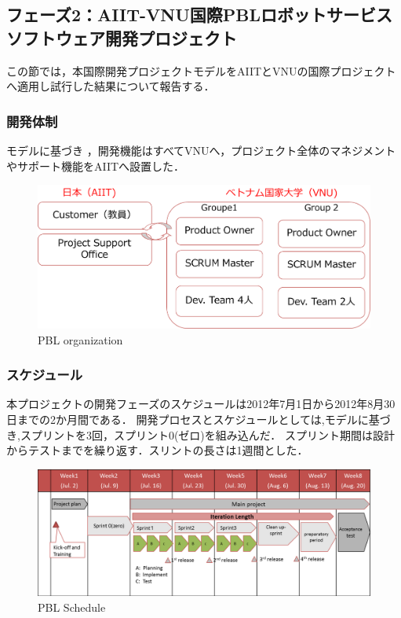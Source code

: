\documentclass[a4j, 12Q, twocolumn, twoside]{jsarticle}
\begin{document}
\subsection{フェーズ2：AIIT-VNU国際PBLロボットサービスソフトウェア開発プロジェクト}

この節では，本国際開発プロジェクトモデルをAIITとVNUの国際プロジェクトへ適用し試行した結果について報告する．

\subsubsection{開発体制}
モデルに基づき ，開発機能はすべてVNUへ，プロジェクト全体のマネジメントやサポート機能をAIITへ設置した．
\begin{figure}[htb]
  \begin{center}
    \includegraphics[width=\columnwidth]{./figures/PBL_organization.png}
    \caption{PBL organization}
    \label{fig:pblorganization}
  \end{center}
\end{figure}



\subsubsection{スケジュール}
本プロジェクトの開発フェーズのスケジュールは2012年7月1日から2012年8月30日までの2か月間である．
開発プロセスとスケジュールとしては,モデルに基づき,スプリントを3回，スプリント0(ゼロ)を組み込んだ．
スプリント期間は設計からテストまでを繰り返す．スリントの長さは1週間とした．
\begin{figure}[htb]
  \begin{center}
    \includegraphics[width=\columnwidth]{./figures/PBLSchedule.png}
    \caption{PBL Schedule}
    \label{fig:PBLSchedule}
  \end{center}
\end{figure}
\end{document}
